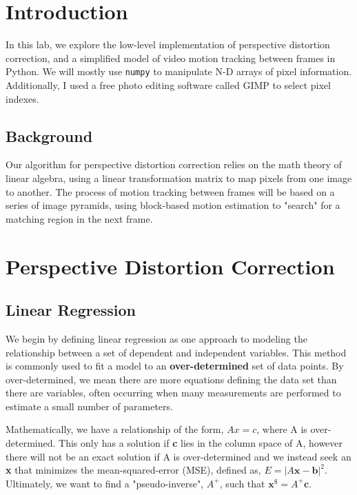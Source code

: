 \documentclass[11pt,a4paper]{article}
\begin{document}
\pagebreak

\tableofcontents

\pagebreak

\section{Introduction}
In this lab, we explore the low-level implementation of perspective distortion correction, and a simplified model of video motion tracking between frames in Python. We will mostly use \verb|numpy| to manipulate N-D arrays of pixel information. Additionally, I used a free photo editing software called GIMP to select pixel indexes.

\subsection{Background}
Our algorithm for perspective distortion correction relies on the math theory of linear algebra, using a linear transformation matrix to map pixels from one image to another. The process of motion tracking between frames will be based on a series of image pyramids, using block-based motion estimation to "search" for a matching region in the next frame.

\section{Perspective Distortion Correction}
\subsection{Linear Regression}
We begin by defining linear regression as one approach to modeling the relationship between a set of dependent and independent variables. This method is commonly used to fit a model to an \textbf{over-determined} set of data points. By over-determined, we mean there are more equations defining the data set than there are variables, often occurring when many measurements are performed to estimate a small number of parameters. 

Mathematically, we have a relationship of the form, $Ax=c$, where A is over-determined. This only has a solution if \textbf{c} lies in the column space of A, however there will not be an exact solution if A is over-determined and we instead seek an \textbf{x} that minimizes the mean-squared-error (MSE), defined as, $E=|A\textbf{x}-\textbf{b}|^2$. Ultimately, we want to find a "pseudo-inverse", $A^+$, such that $\textbf{x}^\$=A^+\textbf{c}$.
\end{document}
